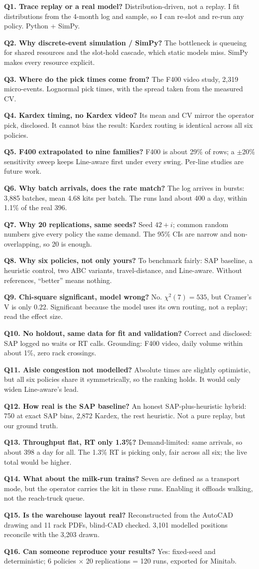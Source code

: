 \documentclass[11pt]{article}
\newcommand{\bg}{\fontsize{18}{22.5}\selectfont}
\newcommand{\sheet}[2]{%
  \noindent\begin{minipage}[t][131mm][t]{\linewidth}#1\end{minipage}%
  \par\vspace{1mm}{\color{grey}\rule{\linewidth}{0.8pt}}\par\vspace{1mm}%
  \noindent\begin{minipage}[t][131mm][t]{\linewidth}#2\end{minipage}\clearpage}
\newcommand{\Q}[2]{{\bg\textbf{#1} #2\par}\vspace{8pt}}
\begin{document}
\sheet
{\Q{Q1. Trace replay or a real model?}{Distribution-driven, not a replay. I fit
 distributions from the 4-month log and sample, so I can re-slot and re-run any policy.
 Python + SimPy.}
 \Q{Q2. Why discrete-event simulation / SimPy?}{The bottleneck is queueing for shared
 resources and the slot-hold cascade, which static models miss. SimPy makes every resource
 explicit.}
 \Q{Q3. Where do the pick times come from?}{The F400 video study, 2,319 micro-events.
 Lognormal pick times, with the spread taken from the measured CV.}
 \Q{Q4. Kardex timing, no Kardex video?}{Its mean and CV mirror the operator pick,
 disclosed. It cannot bias the result: Kardex routing is identical across all six
 policies.}}
{\Q{Q5. F400 extrapolated to nine families?}{F400 is about 29\% of rows; a $\pm$20\%
 sensitivity sweep keeps Line-aware first under every swing. Per-line studies are future
 work.}
 \Q{Q6. Why batch arrivals, does the rate match?}{The log arrives in bursts: 3,885 batches,
 mean 4.68 kits per batch. The runs land about 400 a day, within 1.1\% of the real 396.}
 \Q{Q7. Why 20 replications, same seeds?}{Seed $42+i$; common random numbers give every
 policy the same demand. The 95\% CIs are narrow and non-overlapping, so 20 is enough.}
 \Q{Q8. Why six policies, not only yours?}{To benchmark fairly: SAP baseline, a heuristic
 control, two ABC variants, travel-distance, and Line-aware. Without references, ``better''
 means nothing.}}

\sheet
{\Q{Q9. Chi-square significant, model wrong?}{No. $\chi^2(7)=535$, but Cramer's V is only
 0.22. Significant because the model uses its own routing, not a replay; read the effect
 size.}
 \Q{Q10. No holdout, same data for fit and validation?}{Correct and disclosed: SAP logged
 no waits or RT calls. Grounding: F400 video, daily volume within about 1\%, zero rack
 crossings.}
 \Q{Q11. Aisle congestion not modelled?}{Absolute times are slightly optimistic, but all
 six policies share it symmetrically, so the ranking holds. It would only widen Line-aware's
 lead.}
 \Q{Q12. How real is the SAP baseline?}{An honest SAP-plus-heuristic hybrid: 750 at exact
 SAP bins, 2,872 Kardex, the rest heuristic. Not a pure replay, but our ground truth.}}
{\Q{Q13. Throughput flat, RT only 1.3\%?}{Demand-limited: same arrivals, so about 398 a day
 for all. The 1.3\% RT is picking only, fair across all six; the live total would be
 higher.}
 \Q{Q14. What about the milk-run trains?}{Seven are defined as a transport mode, but the
 operator carries the kit in these runs. Enabling it offloads walking, not the reach-truck
 queue.}
 \Q{Q15. Is the warehouse layout real?}{Reconstructed from the AutoCAD drawing and 11 rack
 PDFs, blind-CAD checked. 3,101 modelled positions reconcile with the 3,203 drawn.}
 \Q{Q16. Can someone reproduce your results?}{Yes: fixed-seed and deterministic; 6 policies
 $\times$ 20 replications = 120 runs, exported for Minitab.}}
\end{document}
